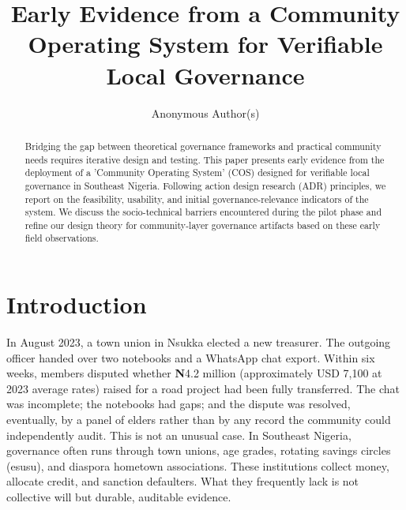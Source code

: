 \documentclass[sigconf,anonymous]{acmart}
\begin{document}
\title{Early Evidence from a Community Operating System for Verifiable Local Governance}

\author{Anonymous Author(s)}

\begin{abstract}
Bridging the gap between theoretical governance frameworks and practical community needs requires iterative design and testing. This paper presents early evidence from the deployment of a 'Community Operating System' (COS) designed for verifiable local governance in Southeast Nigeria. Following action design research (ADR) principles, we report on the feasibility, usability, and initial governance-relevance indicators of the system. We discuss the socio-technical barriers encountered during the pilot phase and refine our design theory for community-layer governance artifacts based on these early field observations.
\end{abstract}



\maketitle

\section{Introduction}

In August 2023, a town union in Nsukka elected a new treasurer. The outgoing officer handed over two notebooks and a WhatsApp chat export. Within six weeks, members disputed whether \textbf{N}4.2 million (approximately USD 7,100 at 2023 average rates) raised for a road project had been fully transferred. The chat was incomplete; the notebooks had gaps; and the dispute was resolved, eventually, by a panel of elders rather than by any record the community could independently audit. This is not an unusual case. In Southeast Nigeria, governance often runs through town unions, age grades, rotating savings circles (esusu), and diaspora hometown associations. These institutions collect money, allocate credit, and sanction defaulters. What they frequently lack is not collective will but durable, auditable evidence.
\end{document}
